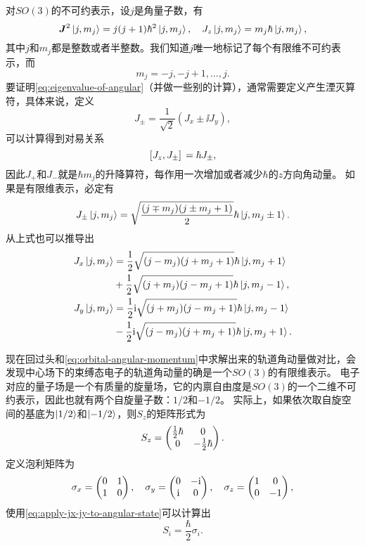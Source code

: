 对$SO(3)$的不可约表示，设$j$是角量子数，有
\begin{equation}
    {\vb*{J}}^2 \ket{j,m_j} = j(j+1)\hbar^2 \ket{j,m_j}, \quad {J}_z \ket{j,m_j} = m_j \hbar \ket{j,m_j},
    \label{eq:eigenvalue-of-angular}
\end{equation}
其中$j$和$m_j$都是整数或者半整数。我们知道$j$唯一地标记了每个有限维不可约表示，而
\begin{equation}
    m_j = -j, -j+1, \ldots, j.
\end{equation}
要证明\eqref{eq:eigenvalue-of-angular}（并做一些别的计算），通常需要定义产生湮灭算符，具体来说，定义
\begin{equation}
    {J}_\pm = \frac{1}{\sqrt{2}} ({J}_x \pm \ii {J}_y),
\end{equation}
可以计算得到对易关系
\begin{equation}
    \comm*{{J}_z}{{J}_\pm} = \hbar {J}_\pm,
\end{equation}
因此${J}_+$和${J}_-$就是$\hbar m_j$的升降算符，每作用一次增加或者减少$\hbar$的$z$方向角动量。
如果是有限维表示，必定有
\begin{equation}
    {J}_\pm \ket{j, m_j} = \sqrt{\frac{(j \mp m_j)(j \pm m_j + 1)}{2}} \hbar \ket{j, m_j \pm 1}.
\end{equation}
从上式也可以推导出
\begin{equation}
    \begin{aligned}
        {J}_x \ket{j, m_j} &= \frac{1}{2} \sqrt{(j-m_j)(j+m_j+1)} \hbar \ket{j, m_j+1} \\
        &+ \frac{1}{2} \sqrt{(j+m_j)(j-m_j+1)} \hbar \ket{j, m_j-1} , \\
        {J}_y \ket{j, m_j} &= \frac{1}{2} \mathrm{i} \sqrt{(j+m_j)(j-m_j+1)} \hbar \ket{j, m_j-1} \\
        &- \frac{1}{2} \mathrm{i} \sqrt{(j-m_j)(j+m_j+1)} \hbar \ket{j, m_j+1}.
    \end{aligned}
    \label{eq:apply-jx-jy-to-angular-state}
\end{equation}

现在回过头和\eqref{eq:orbital-angular-momentum}中求解出来的轨道角动量做对比，会发现中心场下的束缚态电子的轨道角动量的确是一个$SO(3)$的有限维表示。
电子对应的量子场是一个有质量的旋量场，它的内禀自由度是$SO(3)$的一个二维不可约表示，因此也就有两个自旋量子数：$1/2$和$-1/2$。
实际上，如果依次取自旋空间的基底为$\ket{1/2}$和$\ket{-1/2}$，则${S}_z$的矩阵形式为
\[
    {S}_z = \pmqty{\frac{1}{2} \hbar & 0 \\ 0 & -\frac{1}{2} \hbar}.
\]
定义泡利矩阵为
\begin{equation}
    \sigma_x = \pmqty{0 & 1 \\ 1 & 0}, \quad \sigma_y = \pmqty{0 & -\ii \\ \ii & 0}, \quad \sigma_z = \pmqty{1 & 0 \\ 0 & -1},
\end{equation}
使用\eqref{eq:apply-jx-jy-to-angular-state}可以计算出
\begin{equation}
    {S}_i = \frac{\hbar}{2} \sigma_i.
\end{equation}

